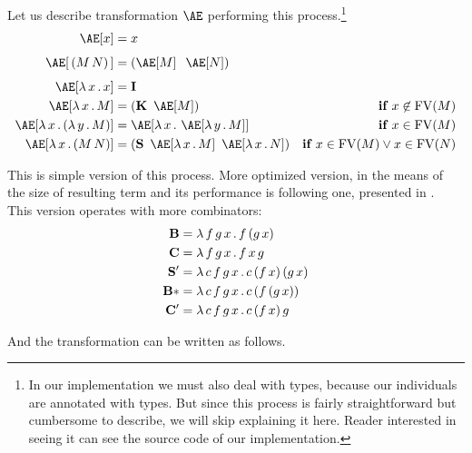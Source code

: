 \documentclass[12pt,a4paper]{report}
\newcommand{\Lets}{Let us\xspace}
\begin{document}
\Lets describe transformation $\Ae$ performing this 
process.\footnote{In our implementation we must also deal with types, because 
our individuals are annotated with types. But since this process
is fairly straightforward but cumbersome to describe, we will 
skip explaining it here. Reader interested in seeing it can see 
the source code of our implementation. }
\begin{align*}
\Ae[x]           &= x &\\[0.4em]
\Ae[\,(M\,N)\,]  &= (\Ae[M]\;\;\Ae[N]) &\\[0.4em]
\Ae[\lam{x}{x}]  &= \Icomb &\\
\Ae[\lam{x}{M}]  &= (\Kcomb~\Ae[M]) &\textbf{if } x \not\in \FV(M)\\
\Ae[\lam{x}{\lamb{y}{M}}] &= \Ae[\lam{x}{\Ae[\lam{y}{M}]}]  
&\textbf{if } x \in \FV(M)\\
\Ae[\lam{x}{(M\,N)}] &= (\Scomb~\Ae[\lam{x}{M}]~\Ae[\lam{x}{N}])  
&\textbf{if } x \in \FV(M) \vee x \in \FV(N)\\
\end{align*}

\newcommand{\Bcomb }{\mathbf{B}}   
\newcommand{\BBcomb }{\mathbf{B*}}
\newcommand{\Ccomb }{\mathbf{C}}   
\newcommand{\CCcomb }{\mathbf{C'}}
\newcommand{\SScomb }{\mathbf{S'}}

This is simple version of this process. More optimized version,
in the means of the size of resulting term and its performance
is following one, presented in \cite{jones87}.\\

This version operates with more combinators:\\

\begin{align*}
\Bcomb  &= \lam{f\,g\,x}{f\,(g\,x)} \\
\Ccomb  &= \lam{f\,g\,x}{f\,x\,g} \\
\SScomb &= \lam{c\,f\,g\,x}{c\,(f\,x)\,(g\,x)} \\
\BBcomb &= \lam{c\,f\,g\,x}{c\,(f\,(g\,x))} \\
\CCcomb &= \lam{c\,f\,g\,x}{c\,(f\,x)\,g} \\
\end{align*}

\newpage
And the transformation can be written as follows.
\end{document}

